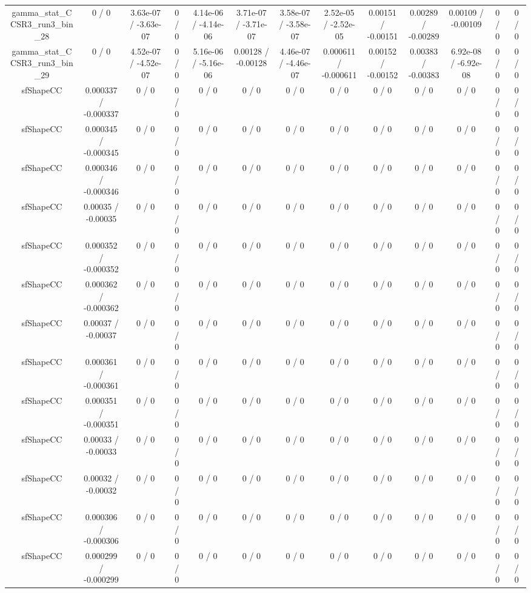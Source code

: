 \documentclass[10pt]{article}
\begin{document}
\begin{table}[htbp]
\begin{center}
\begin{tabular}{|c|c|c|c|c|c|c|c|c|c|c|c|c|}
  gamma_stat_CCSR3_run3_bin_28 & 0 / 0 & 3.63e-07 / -3.63e-07 & 0 / 0 & 4.14e-06 / -4.14e-06 & 3.71e-07 / -3.71e-07 & 3.58e-07 / -3.58e-07 & 2.52e-05 / -2.52e-05 & 0.00151 / -0.00151 & 0.00289 / -0.00289 & 0.00109 / -0.00109 & 0 / 0 & 0 / 0 \\ 
  gamma_stat_CCSR3_run3_bin_29 & 0 / 0 & 4.52e-07 / -4.52e-07 & 0 / 0 & 5.16e-06 / -5.16e-06 & 0.00128 / -0.00128 & 4.46e-07 / -4.46e-07 & 0.000611 / -0.000611 & 0.00152 / -0.00152 & 0.00383 / -0.00383 & 6.92e-08 / -6.92e-08 & 0 / 0 & 0 / 0 \\ 
  sfShapeCC & 0.000337 / -0.000337 & 0 / 0 & 0 / 0 & 0 / 0 & 0 / 0 & 0 / 0 & 0 / 0 & 0 / 0 & 0 / 0 & 0 / 0 & 0 / 0 & 0 / 0 \\ 
  sfShapeCC & 0.000345 / -0.000345 & 0 / 0 & 0 / 0 & 0 / 0 & 0 / 0 & 0 / 0 & 0 / 0 & 0 / 0 & 0 / 0 & 0 / 0 & 0 / 0 & 0 / 0 \\ 
  sfShapeCC & 0.000346 / -0.000346 & 0 / 0 & 0 / 0 & 0 / 0 & 0 / 0 & 0 / 0 & 0 / 0 & 0 / 0 & 0 / 0 & 0 / 0 & 0 / 0 & 0 / 0 \\ 
  sfShapeCC & 0.00035 / -0.00035 & 0 / 0 & 0 / 0 & 0 / 0 & 0 / 0 & 0 / 0 & 0 / 0 & 0 / 0 & 0 / 0 & 0 / 0 & 0 / 0 & 0 / 0 \\ 
  sfShapeCC & 0.000352 / -0.000352 & 0 / 0 & 0 / 0 & 0 / 0 & 0 / 0 & 0 / 0 & 0 / 0 & 0 / 0 & 0 / 0 & 0 / 0 & 0 / 0 & 0 / 0 \\ 
  sfShapeCC & 0.000362 / -0.000362 & 0 / 0 & 0 / 0 & 0 / 0 & 0 / 0 & 0 / 0 & 0 / 0 & 0 / 0 & 0 / 0 & 0 / 0 & 0 / 0 & 0 / 0 \\ 
  sfShapeCC & 0.00037 / -0.00037 & 0 / 0 & 0 / 0 & 0 / 0 & 0 / 0 & 0 / 0 & 0 / 0 & 0 / 0 & 0 / 0 & 0 / 0 & 0 / 0 & 0 / 0 \\ 
  sfShapeCC & 0.000361 / -0.000361 & 0 / 0 & 0 / 0 & 0 / 0 & 0 / 0 & 0 / 0 & 0 / 0 & 0 / 0 & 0 / 0 & 0 / 0 & 0 / 0 & 0 / 0 \\ 
  sfShapeCC & 0.000351 / -0.000351 & 0 / 0 & 0 / 0 & 0 / 0 & 0 / 0 & 0 / 0 & 0 / 0 & 0 / 0 & 0 / 0 & 0 / 0 & 0 / 0 & 0 / 0 \\ 
  sfShapeCC & 0.00033 / -0.00033 & 0 / 0 & 0 / 0 & 0 / 0 & 0 / 0 & 0 / 0 & 0 / 0 & 0 / 0 & 0 / 0 & 0 / 0 & 0 / 0 & 0 / 0 \\ 
  sfShapeCC & 0.00032 / -0.00032 & 0 / 0 & 0 / 0 & 0 / 0 & 0 / 0 & 0 / 0 & 0 / 0 & 0 / 0 & 0 / 0 & 0 / 0 & 0 / 0 & 0 / 0 \\ 
  sfShapeCC & 0.000306 / -0.000306 & 0 / 0 & 0 / 0 & 0 / 0 & 0 / 0 & 0 / 0 & 0 / 0 & 0 / 0 & 0 / 0 & 0 / 0 & 0 / 0 & 0 / 0 \\ 
  sfShapeCC & 0.000299 / -0.000299 & 0 / 0 & 0 / 0 & 0 / 0 & 0 / 0 & 0 / 0 & 0 / 0 & 0 / 0 & 0 / 0 & 0 / 0 & 0 / 0 & 0 / 0 \\ 

\end{tabular}
\end{center}
\end{table}
\end{document}
